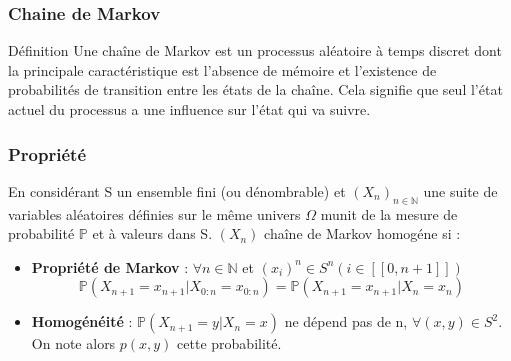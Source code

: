 \begin{frame}
    \frametitle{Chaine de Markov}

    \begin{block}{Définition}
        Une chaîne de Markov est un processus aléatoire à temps discret dont la principale caractéristique est l’absence de mémoire et l’existence de probabilités de transition entre les états de la chaîne. Cela signifie que seul l’état actuel du processus a une influence sur l’état qui va suivre.
    \end{block}


\end{frame}

\begin{frame}
    \frametitle{Propriété}

        En considérant S un ensemble fini (ou dénombrable) et $(X_n)_{n \in \mathbb{N}}$ une suite de variables aléatoires définies sur le même univers $\Omega$ munit de la mesure de probabilité $\mathbb{P}$ et à valeurs dans S. $(X_n)$ chaîne de Markov homogéne si :

        \begin{itemize}
            \item \textbf{Propriété de Markov} : $\forall n \in \mathbb{N}$ et $(x_i)^n \in S^n (i \in [[0, n+1]])$ \\
            $$ \mathbb{P}(X_{n+1} = x_{n+1} | X_{0:n} = x_{0:n}) = \mathbb{P}(X_{n+1} = x_{n+1} | X_n = x_n) $$
            \item \textbf{Homogénéité} : $\mathbb{P}(X_{n+1} = y | X_n = x)$ ne dépend pas de n, $\forall (x, y) \in S^2$. On note alors $p(x, y)$ cette probabilité.
        \end{itemize}
\end{frame}
